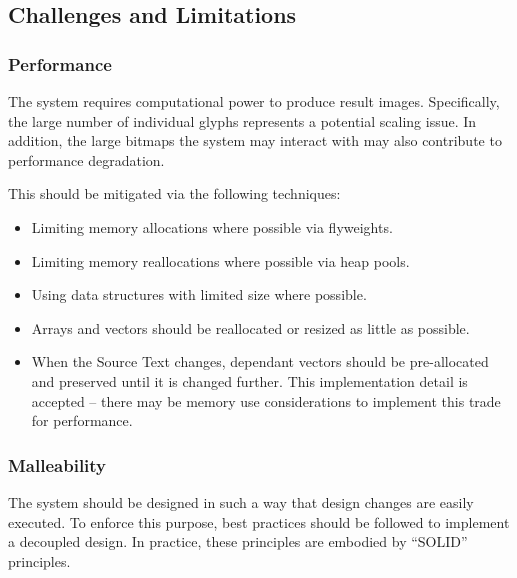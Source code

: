 \subsection{Challenges and Limitations}
\subsubsection{Performance}
The system requires computational power to produce result images.
Specifically, the large number of individual glyphs represents a potential scaling issue.
In addition, the large bitmaps the system may interact with may also contribute to performance degradation.

This should be mitigated via the following techniques:
\begin{itemize}
    \item Limiting memory allocations where possible via flyweights.
    \item Limiting memory reallocations where possible via heap pools.
    \item Using data structures with limited size where possible.
    \item Arrays and vectors should be reallocated or resized as little as possible.
    \item {
          When the {Source Text} changes, dependant vectors should be pre-allocated and preserved until it is changed further.
          This implementation detail is accepted -- there may be memory use considerations to implement this trade for performance.
          }
\end{itemize}


\subsubsection{Malleability}
The system should be designed in such a way that design changes are easily executed.
To enforce this purpose, best practices should be followed to implement a decoupled design.
In practice, these principles are embodied by ``SOLID'' principles.

